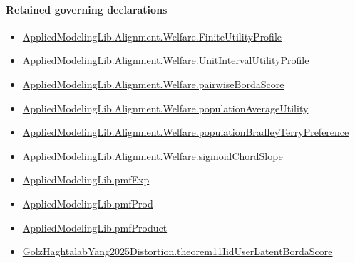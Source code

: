 \documentclass[10pt]{article}
\begin{document}
\paragraph{Retained governing declarations}
\begin{itemize}\raggedright
\item \hyperlink{library-prerequisite-56c0734f8877ddbe}{Applied\allowbreak{}Modeling\allowbreak{}Lib.\allowbreak{}Alignment.\allowbreak{}Welfare.\allowbreak{}Finite\allowbreak{}Utility\allowbreak{}Profile}
\item \hyperlink{library-prerequisite-cbe8afa0d6d1ba78}{Applied\allowbreak{}Modeling\allowbreak{}Lib.\allowbreak{}Alignment.\allowbreak{}Welfare.\allowbreak{}Unit\allowbreak{}Interval\allowbreak{}Utility\allowbreak{}Profile}
\item \hyperlink{governing-declaration-3808cf59ea39b435}{Applied\allowbreak{}Modeling\allowbreak{}Lib.\allowbreak{}Alignment.\allowbreak{}Welfare.\allowbreak{}pairwise\allowbreak{}Borda\allowbreak{}Score}
\item \hyperlink{library-prerequisite-15f4b442749deab2}{Applied\allowbreak{}Modeling\allowbreak{}Lib.\allowbreak{}Alignment.\allowbreak{}Welfare.\allowbreak{}population\allowbreak{}Average\allowbreak{}Utility}
\item \hyperlink{library-prerequisite-cf06d15d7f8b7c31}{Applied\allowbreak{}Modeling\allowbreak{}Lib.\allowbreak{}Alignment.\allowbreak{}Welfare.\allowbreak{}population\allowbreak{}Bradley\allowbreak{}Terry\allowbreak{}Preference}
\item \hyperlink{governing-declaration-a4d623b8c608b566}{Applied\allowbreak{}Modeling\allowbreak{}Lib.\allowbreak{}Alignment.\allowbreak{}Welfare.\allowbreak{}sigmoid\allowbreak{}Chord\allowbreak{}Slope}
\item \hyperlink{governing-declaration-8e4b4389a4f6454b}{Applied\allowbreak{}Modeling\allowbreak{}Lib.\allowbreak{}pmf\allowbreak{}Exp}
\item \hyperlink{library-prerequisite-de8e2a8bfe221a38}{Applied\allowbreak{}Modeling\allowbreak{}Lib.\allowbreak{}pmf\allowbreak{}Prod}
\item \hyperlink{governing-declaration-5ac12d0a52b69068}{Applied\allowbreak{}Modeling\allowbreak{}Lib.\allowbreak{}pmf\allowbreak{}Product}
\item \hyperlink{governing-declaration-7506044331f97cc9}{Golz\allowbreak{}Haghtalab\allowbreak{}Yang2025\allowbreak{}Distortion.\allowbreak{}theorem11\allowbreak{}Iid\allowbreak{}User\allowbreak{}Latent\allowbreak{}Borda\allowbreak{}Score}

\end{itemize}
\end{document}
